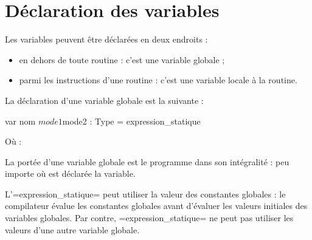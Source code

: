 




\chapter{Déclaration des variables}

Les variables peuvent être déclarées en deux endroits :
\begin{itemize}
  \item en dehors de toute routine : c'est une variable globale ;
  \item parmi les instructions d'une routine : c'est une variable locale à la routine.
\end{itemize}






La déclaration d'une variable globale est la suivante :

\begin{PLM}
var nom $mode1 $mode2 : Type = expression_statique
\end{PLM}

Où :

La portée d'une variable globale est le programme dans son intégralité : peu importe où est déclarée la variable.

L'\plm=expression_statique= peut utiliser la valeur des constantes globales : le compilateur évalue les constantes globales avant d'évaluer les valeurs initiales des variables globales. Par contre, \plm=expression_statique= ne peut pas utiliser les valeurs d'une autre variable globale.

